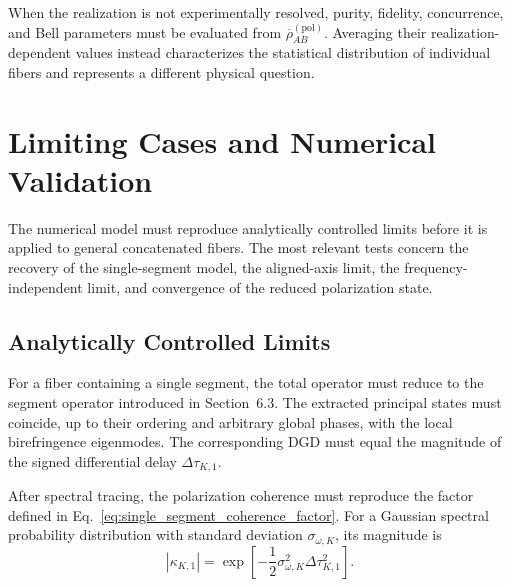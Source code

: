 When the realization is not experimentally resolved, purity, fidelity,
concurrence, and Bell parameters must be evaluated from
\(\overline{\rho}_{AB}^{(\mathrm{pol})}\). Averaging their
realization-dependent values instead characterizes the statistical
distribution of individual fibers and represents a different physical
question.


\section{Limiting Cases and Numerical Validation}
\label{sec:segmented_fiber_validation}

The numerical model must reproduce analytically controlled limits before it
is applied to general concatenated fibers. The most relevant tests concern
the recovery of the single-segment model, the aligned-axis limit, the
frequency-independent limit, and convergence of the reduced polarization
state.


\subsection{Analytically Controlled Limits}

For a fiber containing a single segment, the total operator must reduce to
the segment operator introduced in Section~6.3. The extracted principal
states must coincide, up to their ordering and arbitrary global phases, with
the local birefringence eigenmodes. The corresponding DGD must equal the
magnitude of the signed differential delay \(\Delta\tau_{K,1}\).

After spectral tracing, the polarization coherence must reproduce the factor
defined in Eq.~\eqref{eq:single_segment_coherence_factor}. For a Gaussian
spectral probability distribution with standard deviation
\(\sigma_{\omega,K}\), its magnitude is
%
\begin{equation}
    \left|\kappa_{K,1}\right|
    =
    \exp
    \left[
        -
        \frac{1}{2}
        \sigma_{\omega,K}^{2}
        \Delta\tau_{K,1}^{2}
    \right].
    \label{eq:single_segment_gaussian_validation_target}
\end{equation}


